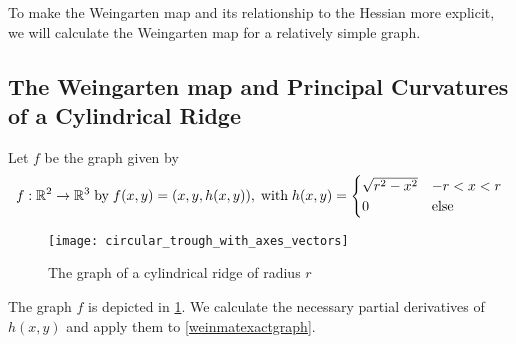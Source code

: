 %
%
%

  
  To make the Weingarten map and its relationship to the Hessian more explicit, we will calculate the Weingarten map for a relatively simple graph.
  
  \subsection{The Weingarten map and Principal Curvatures of a Cylindrical Ridge} \label{sec:calculate-weinmap-of-a-ridge}
  
  Let $f$ be the graph given by 
  \begin{equation}
   f: \mathbb{R}^2 \to \mathbb{R}^3 \;\textrm{by}\; f(x,y) = (x,y,h(x,y)), \;\textrm{with}\;
   h(x,y) = \begin{cases}
    \sqrt{r^2 - x^2} & -r < x < r \\
    0 & \textrm{else}
    \end{cases}
  \end{equation} 
  \begin{figure}[h!]
  \texttt{[image: circular\_trough\_with\_axes\_vectors]}
  \caption{The graph of a cylindrical ridge of radius $r$}
  \label{fig:ridge-graph}
  \end{figure}
  
  
  The graph $f$ is depicted in \cref{fig:ridge-graph}. We calculate the necessary partial derivatives of $h(x,y)$ and apply them to \cref{weinmatexactgraph}.
  
